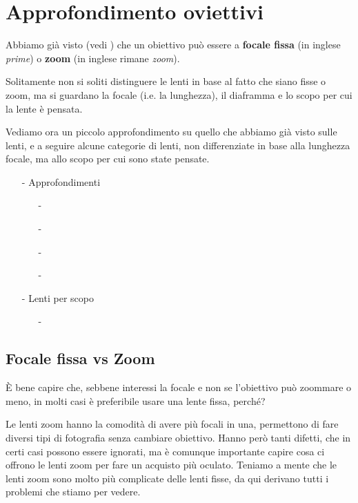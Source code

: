 \section{Approfondimento oviettivi} \label{sec:obiettivi_approfondimento}
Abbiamo già visto (vedi ) che un obiettivo può essere a \textbf{focale fissa} (in inglese \textit{prime}) o \textbf{zoom} (in inglese rimane \textit{zoom}).

Solitamente non si soliti distinguere le lenti in base al fatto che siano fisse o zoom, ma si guardano la focale (i.e. la lunghezza), il diaframma e lo scopo per cui la lente è pensata.

Vediamo ora un piccolo approfondimento su quello che abbiamo già visto sulle lenti, e a seguire alcune categorie di lenti, non differenziate in base alla lunghezza focale, ma allo scopo per cui sono state pensate.
\begin{itemize}
    \item[-] Approfondimenti
        \begin{itemize}
            \item[-] 
            \item[-] 
            \item[-] 
            \item[-] 
        \end{itemize}
    \item[-] Lenti per scopo
        \begin{itemize}
            \item[-] 
        \end{itemize}
\end{itemize}


\subsection{Focale fissa vs Zoom} \label{subsec:primevszoom}
È bene capire che, sebbene interessi la focale e non se l'obiettivo può zoommare o meno, in molti casi è preferibile usare una lente fissa, perché?

Le lenti zoom hanno la comodità di avere più focali in una, permettono di fare diversi tipi di fotografia senza cambiare obiettivo. Hanno però tanti difetti, che in certi casi possono essere ignorati, ma è comunque importante capire cosa ci offrono le lenti zoom per fare un acquisto più oculato. Teniamo a mente che le lenti zoom sono molto più complicate delle lenti fisse, da qui derivano tutti i problemi che stiamo per vedere.

